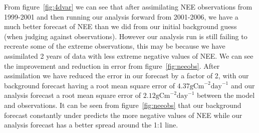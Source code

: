 \documentclass[11pt]{article}
\begin{document}
From figure~\ref{fig:4dvar} we can see that after assimilating NEE observations from 1999-2001 and then running our analysis forward from 2001-2006, we have a much better forecast of NEE than we did from our initial background guess (when judging against observations). However our analysis run is still failing to recreate some of the extreme observations, this may be because we have assimilated 2 years of data with less extreme negative values of NEE. We can see the improvement and reduction in error from figure~\ref{fig:neeobs}. After assimilation we have reduced the error in our forecast by a factor of 2, with our background forecast having a root mean square error of $4.37 \text{gCm}^{-2}\text{day}^{-1}$ and our analysis forecast a root mean square error of $2.12 \text{gCm}^{-2}\text{day}^{-1}$ between the model and observations. It can be seen from figure~\ref{fig:neeobs} that our background forecast constantly under predicts the more negative values of NEE while our analysis forecast has a better spread around the 1:1 line.
\end{document}
